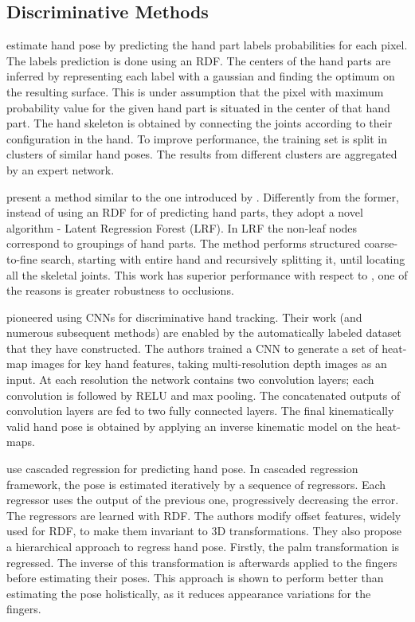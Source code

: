 \subsection{Discriminative Methods}

\hspace{-0.4em}
\textbf{\cite{keskin2012hand}} estimate hand pose by predicting the hand part labels probabilities for each pixel. The labels prediction is done using an RDF. The centers of the hand parts are inferred by representing each label with a gaussian and finding the optimum on the resulting surface. This is under assumption that the pixel with maximum probability value for the given hand part is situated in the center of that hand part. The hand skeleton is obtained by connecting the joints according to their configuration in the hand. To improve performance, the training set is split in clusters of similar hand poses. The results from different clusters are aggregated by an expert network.
   
\hspace{-0.4em}
\textbf{\cite{tang_cvpr14}} present a method similar to the one introduced by \cite{keskin2012hand}. Differently from the former, instead of using an RDF for of predicting hand parts, they adopt a novel algorithm -  Latent Regression Forest (LRF). In LRF the non-leaf nodes correspond to groupings of hand parts. The method performs structured coarse-to-fine search, starting with entire hand and recursively splitting it, until locating all the skeletal joints. This work has superior performance with respect to \cite{keskin2012hand}, one of the reasons is greater robustness to occlusions.

\hspace{-0.4em}
\textbf{\cite{tompson2014real}} pioneered using CNNs for discriminative hand tracking. Their work (and numerous subsequent methods) are enabled by the automatically labeled dataset that they have constructed. The authors trained a CNN to generate a set of heat-map images for key hand features, taking multi-resolution depth images as an input. At each resolution the network contains two convolution layers; each convolution is followed by RELU and max pooling. The concatenated outputs of convolution layers are fed to two fully connected layers. The final kinematically valid hand pose is obtained by applying an inverse kinematic model on the heat-maps.

\hspace{-0.4em}
\textbf{\cite{sun2015cascaded}} use cascaded regression for predicting hand pose. In cascaded regression framework, the pose is estimated iteratively by a sequence of regressors. Each regressor uses the output of the previous one, progressively decreasing the error. The regressors are learned with RDF. The authors modify offset features, widely used for RDF, to make them invariant to 3D transformations. They also propose a hierarchical approach to regress hand pose. Firstly, the palm transformation is regressed. The inverse of this transformation is afterwards applied to the fingers before estimating their poses. This approach is shown to perform better than estimating the pose holistically, as it reduces appearance variations for the fingers.


